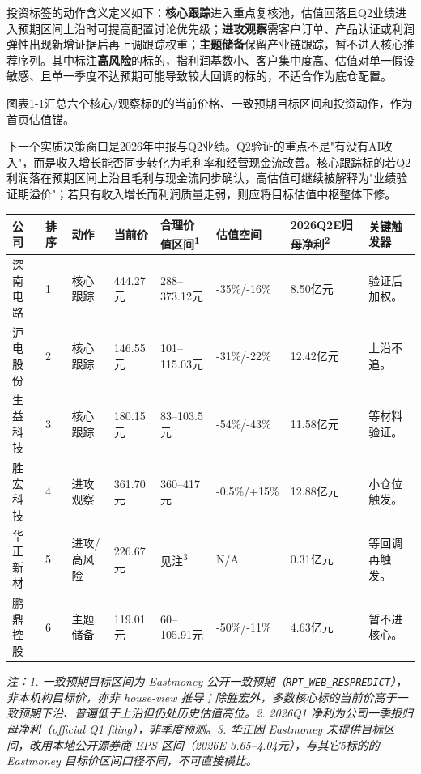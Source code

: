 投资标签的动作含义定义如下：\textbf{核心跟踪}进入重点复核池，估值回落且Q2业绩进入预期区间上沿时可提高配置讨论优先级；\textbf{进攻观察}需客户订单、产品认证或利润弹性出现新增证据后再上调跟踪权重；\textbf{主题储备}保留产业链跟踪，暂不进入核心推荐序列。其中标注\textbf{高风险}的标的，指利润基数小、客户集中度高、估值对单一假设敏感、且单一季度不达预期可能导致较大回调的标的，不适合作为底仓配置。

图表1-1汇总六个核心/观察标的的当前价格、一致预期目标区间和投资动作，作为首页估值锚。

下一个实质决策窗口是2026年中报与Q2业绩。Q2验证的重点不是"有没有AI收入"，而是收入增长能否同步转化为毛利率和经营现金流改善。核心跟踪标的若Q2利润落在预期区间上沿且毛利与现金流同步确认，高估值可继续被解释为"业绩验证期溢价"；若只有收入增长而利润质量走弱，则应将目标估值中枢整体下修。

\begin{exhibitbox}[图表1-1：首页估值锚与投资动作]
\scriptsize
\begin{tabularx}{\textwidth}{L{1.55cm}C{0.65cm}L{1.35cm}R{1.15cm}R{1.85cm}R{1.55cm}R{1.55cm}X}
\toprule
\textbf{公司} & \textbf{排序} & \textbf{动作} & \textbf{当前价} & \textbf{合理价值区间}\textsuperscript{1} & \textbf{估值空间} & \textbf{2026Q2E归母净利}\textsuperscript{2} & \textbf{关键触发器} \\
\midrule
深南电路 & 1 & 核心跟踪 & 444.27元 & 288--373.12元 & -35\%/-16\% & 8.50亿元 & 验证后加权。 \\
沪电股份 & 2 & 核心跟踪 & 146.55元 & 101--115.03元 & -31\%/-22\% & 12.42亿元 & 上沿不追。 \\
生益科技 & 3 & 核心跟踪 & 180.15元 & 83--103.5元 & -54\%/-43\% & 11.58亿元 & 等材料验证。 \\
胜宏科技 & 4 & 进攻观察 & 361.70元 & 360--417元 & -0.5\%/+15\% & 12.88亿元 & 小仓位触发。 \\
华正新材 & 5 & 进攻/高风险 & 226.67元 & 见注\textsuperscript{3} & N/A & 0.31亿元 & 等回调再触发。 \\
鹏鼎控股 & 6 & 主题储备 & 119.01元 & 60--105.91元 & -50\%/-11\% & 4.63亿元 & 暂不进核心。 \\
\bottomrule
\end{tabularx}
\par{\scriptsize\color{mutedgrey}\textit{注：1. 一致预期目标区间为 Eastmoney 公开一致预期（\texttt{RPT\_WEB\_RESPREDICT}），非本机构目标价，亦非 house-view 推导；除胜宏外，多数核心标的当前价高于一致预期下沿、普遍低于上沿但仍处历史估值高位。2. 2026Q1 净利为公司一季报归母净利（official Q1 filing），非季度预测。3. 华正因 Eastmoney 未提供目标区间，改用本地公开源券商 EPS 区间（2026E 3.65--4.04元），与其它5标的的 Eastmoney 目标价区间口径不同，不可直接横比。}}
\end{exhibitbox}

